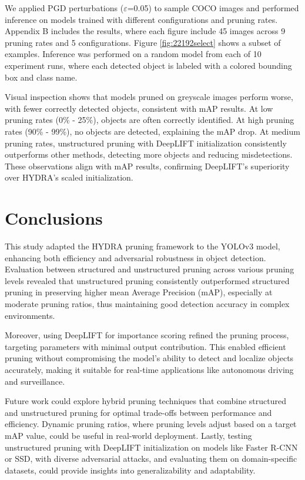 \documentclass[10pt]{cai}
\begin{document}
We applied PGD perturbations ($\varepsilon$=0.05) to sample COCO images and performed inference on models trained with different configurations and pruning rates. Appendix B \cite{MyAppendix} includes the results, where each figure include 45 images across 9 pruning rates and 5 configurations. Figure \ref{fig:22192select} shows a subset of examples. Inference was performed on a random model from each of 10 experiment runs, where each detected object is labeled with a colored bounding box and class name.

Visual inspection shows that models pruned on greyscale images perform worse, with fewer correctly detected objects, consistent with mAP results. At low pruning rates (0\% - 25\%), objects are often correctly identified. At high pruning rates (90\% - 99\%), no objects are detected, explaining the mAP drop. At medium pruning rates, unstructured pruning with DeepLIFT initialization consistently outperforms other methods, detecting more objects and reducing misdetections. These observations align with mAP results, confirming DeepLIFT's superiority over HYDRA's scaled initialization.


\section{Conclusions}
This study adapted the HYDRA pruning framework to the YOLOv3 model, enhancing both efficiency and adversarial robustness in object detection. Evaluation between structured and unstructured pruning across various pruning levels revealed that unstructured pruning consistently outperformed structured pruning in preserving higher mean Average Precision (mAP), especially at moderate pruning ratios, thus maintaining good detection accuracy in complex environments. 

Moreover, using DeepLIFT for importance scoring refined the pruning process, targeting parameters with minimal output contribution. This enabled efficient pruning without compromising the model's ability to detect and localize objects accurately, making it suitable for real-time applications like autonomous driving and surveillance.

Future work could explore hybrid pruning techniques that combine structured and unstructured pruning for optimal trade-offs between performance and efficiency. Dynamic pruning ratios, where pruning levels adjust based on a target mAP value, could be useful in real-world deployment. Lastly, testing unstructured pruning with DeepLIFT initialization on models like Faster R-CNN or SSD, with diverse adversarial attacks, and evaluating them on domain-specific datasets, could provide insights into generalizability and adaptability.
\end{document}
